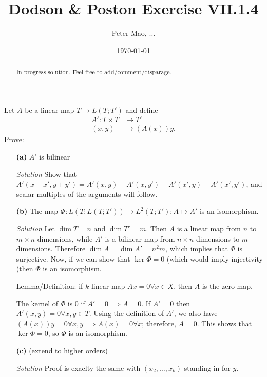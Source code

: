 \documentclass[11pt]{article}
\title{Dodson \& Poston Exercise VII.1.4}
\author{Peter Mao, $\ldots$}
\date{\today}
\begin{document}
\maketitle
\pagestyle{empty}

\begin{abstract}
  In-progress solution.  Feel free to add/comment/disparage.
\end{abstract}

Let $A$ be a linear map $T \to L(T;T')$ and define
\begin{align*}
  A' \colon T \times T &\to T'\\
                 (x,y) &\mapsto (A(x))y.
\end{align*}
Prove:

\begin{itemize}
\item[\textbf{(a)}] $A'$ is bilinear
\item[\emph{Solution}] Show that $A'(x+x',y+y') = A'(x,y) + A'(x,y') + A'(x',y) +A'(x',y')$, and
  scalar multiples of the arguments will follow.

\item[\textbf{(b)}] The map $\Phi \colon L(T;L(T;T')) \to L^2(T;T') \colon A \mapsto A'$ is an isomorphism.
\item[\emph{Solution}] Let $\dim T = n$ and $\dim T' = m$.  Then $A$ is a linear map from $n$ to $m
  \times n$ dimensions, while $A'$ is a bilinear map from $n \times n$ dimensions to $m$ dimensions.
  Therefore $\dim A = \dim A' = n^2m$, which implies that $\Phi$ is surjective.  Now, if we can show
  that $\ker \Phi = 0$ (which would imply injectivity )then $\Phi$ is an isomorphism.

  Lemma/Definition: if $k$-linear map $Ax = 0 \forall x \in X$, then $A$ is the zero map.
  
  The kernel of $\Phi$ is 0 if $A' = 0 \implies A = 0$.  If $A' = 0$ then $A'(x,y) = 0 \forall x,y
  \in T$.  Using the definition of $A'$, we also have $(A(x))y = 0 \forall x,y \implies A(x) = 0
  \forall x$; therefore, $A = 0$.  This shows that $\ker \Phi = 0$, so $\Phi$ is an isomorphism.

\item[\textbf{(c)}] (extend to higher orders)
\item[\emph{Solution}] Proof is exaclty the same with $(x_2,\ldots,x_k)$ standing in for $y$.
  
\end{itemize}
\end{document}
